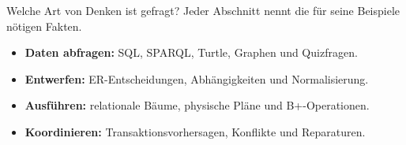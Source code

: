 \begin{frame}[t]{Welche Art von Denken ist gefragt?}
Jeder Abschnitt nennt die für seine Beispiele nötigen Fakten.
\medskip
\begin{itemize}
\item \textbf{Daten abfragen:} SQL, SPARQL, Turtle, Graphen und Quizfragen.
\item \textbf{Entwerfen:} ER-Entscheidungen, Abhängigkeiten und Normalisierung.
\item \textbf{Ausführen:} relationale Bäume, physische Pläne und B+-Operationen.
\item \textbf{Koordinieren:} Transaktionsvorhersagen, Konflikte und Reparaturen.
\end{itemize}
\end{frame}
